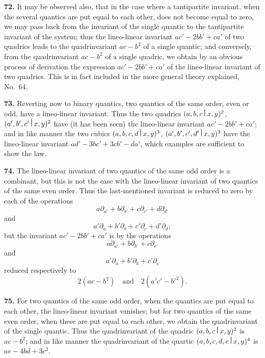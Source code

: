 \documentclass[11pt,a4paper]{book}
\begin{document}
\begin{center}
\medskip
\noindent\textbf{72.} It may be observed also, that in the case where a tantipartite invariant, when the several quantics are put equal to each other, does not become equal to zero, we may pass back from the invariant of the single quantic to the tantipartite invariant of the system; thus the lineo-linear invariant $ac'-2bb'+ca'$ of two quadrics leads to the quadrinvariant $ac-b^2$ of a single quantic; and conversely, from the quadrinvariant $ac-b^2$ of a single quadric, we obtain by an obvious process of derivation the expression $ac'-2bb'+ca'$ of the lineo-linear invariant of two quadrics. This is in fact included in the more general theory explained, No.~64.

\newpage

\medskip
\noindent\textbf{73.} Reverting now to binary quantics, two quantics of the same order, even or odd, have a lineo-linear invariant. Thus the two quadrics $(a,b,c\,\raisebox{0.5ex}{\textbf{\textbar}}\,x,y)^2$, $(a',b',c'\,\raisebox{0.5ex}{\textbf{\textbar}}\,x,y)^2$ have (it has been seen) the lineo-linear invariant $ac'-2bb'+ca'$; and in like manner the two cubics $(a,b,c,d\,\raisebox{0.5ex}{\textbf{\textbar}}\,x,y)^3$, $(a',b',c',d'\,\raisebox{0.5ex}{\textbf{\textbar}}\,x,y)^3$ have the lineo-linear invariant $ad'-3bc'+3cb'-da'$, which examples are sufficient to show the law.

\medskip
\noindent\textbf{74.} The lineo-linear invariant of two quantics of the same odd order is a combinant, but this is not the case with the lineo-linear invariant of two quantics of the same even order. Thus the last-mentioned invariant is reduced to zero by each of the operations
\[a\partial_{a'} + b\partial_{b'} + c\partial_{c'} + d\partial_{d'}\]
and
\[a'\partial_a + b'\partial_b + c'\partial_c + d'\partial_d;\]
but the invariant $ac'-2bb'+ca'$ is by the operations
\[a\partial_{a'} + b\partial_{b'} + c\partial_{c'}\]
and
\[a'\partial_a + b'\partial_b + c'\partial_c\]
reduced respectively to
\[2(ac-b^2)\quad \text{and} \quad 2(a'c'-b'^2).\]

\medskip
\noindent\textbf{75.} For two quantics of the same odd order, when the quantics are put equal to each other, the lineo-linear invariant vanishes; but for two quantics of the same even order, when these are put equal to each other, we obtain the quadrinvariant of the single quantic. Thus the quadrinvariant of the quadric $(a,b,c\,\raisebox{0.5ex}{\textbf{\textbar}}\,x,y)^2$ is $ac-b^2$; and in like manner the quadrinvariant of the quartic $(a,b,c,d,e\,\raisebox{0.5ex}{\textbf{\textbar}}\,x,y)^4$ is $ae-4bd+3c^2$.


\end{center}
\end{document}

